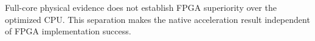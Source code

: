 Full-core physical evidence does not establish FPGA superiority over the optimized CPU. This separation makes the native acceleration result independent of FPGA implementation success.
